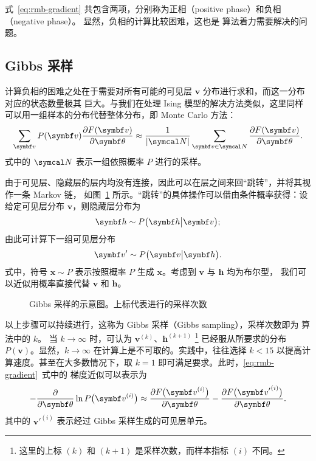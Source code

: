式~\eqref{eq:rmb-gradient} 共包含两项，分别称为正相（positive phase）和负相（negative phase）。
显然，负相的计算比较困难，这也是 \CDk{} 算法着力需要解决的问题。

\subsection{Gibbs 采样}

计算负相的困难之处在于需要对所有可能的可见层 $\bm{v}$ 分布进行求和，而这一分布对应的状态数量极其
巨大。与我们在处理 Ising 模型的解决方法类似，这里同样可以用一组样本的分布代替整体分布，即 Monte
Carlo 方法：
\begin{equation}
  \sum_{\bm{v}} P(\bm{v}) \pdv{F(\bm{v})}{\bm{\theta}}
  \approx \frac{1}{\abs{\domN}} \sum_{\bm{v}\in\domN} \pdv{F(\bm{v})}{\bm{\theta}}.
\end{equation}
式中的 $\domN$ 表示一组依照概率 $P$ 进行的采样。

由于可见层、隐藏层的层内均没有连接，因此可以在层之间来回“跳转”，并将其视作一条 Markov 链，
如图~\ref{fig:gibbs-sampling} 所示。“跳转”的具体操作可以借由条件概率获得：设给定可见层分布
$\bm{v}$，则隐藏层分布为
\begin{equation}
  \label{eq:hidden-layer-dist}
  \bm{h} \sim P\qty\big(\bm{h}\big|\bm{v});
\end{equation}
由此可计算下一组可见层分布
\begin{equation}
  \label{eq:visible-layer-dist}
  \bm{v}' \sim P\qty\big(\bm{v}\big|\bm{h}).
\end{equation}
式中，符号 $\bm{x}\sim P$ 表示按照概率 $P$ 生成 $\bm{x}$。考虑到 $\bm{v}$ 与 $\bm{h}$ 均为布尔型，
我们可以近似用概率直接代替 $\bm{v}$ 和 $\bm{h}$。

\begin{figure}[htb]
  \centering
  \caption{Gibbs 采样的示意图。上标代表进行的采样次数}
  \label{fig:gibbs-sampling}
\end{figure}

以上步骤可以持续进行，这称为 Gibbs 采样（Gibbs sampling），采样次数即为 \CDk{} 算法中的 $k$。
当 $k\to\infty$ 时，可认为 $\bm{v}^{(k)}$、$\bm{h}^{(k+1)}$
\footnote{这里的上标 $(k)$ 和 $(k+1)$ 是采样次数，而样本指标 $(i)$ 不同。}
已经服从所要求的分布 $P(\bm{v})$。显然，$k\to\infty$ 在计算上是不可取的。实践中，往往选择 $k<15$
以提高计算速度。甚至在大多数情况下，取 $k=1$ 即可满足要求。此时，\eqref{eq:rmb-gradient}~式中的
梯度近似可以表示为
\begin{equation}
  \label{eq:rmb-gradient-approx}
  - \pdv{\bm{\theta}} \ln P\qty\big(\bm{v}^{(i)})
  \approx \pdv{F\qty\big(\bm{v}^{(i)})}{\bm{\theta}}
        - \pdv{F\qty\big({\bm{v}'}^{(i)})}{\bm{\theta}}.
\end{equation}
其中的 ${\bm{v}'}^{(i)}$ 表示经过 Gibbs 采样生成的可见层单元。


